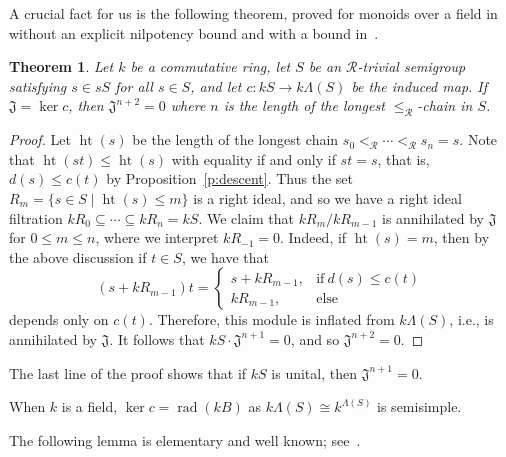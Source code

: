 \documentclass[reqno,11pt]{amsart}
\newcommand{\hgt}{\mathop{\mathrm {ht}}}
\newcommand{\rad}{\mathop{\mathrm{rad}}\nolimits}
\newcommand{\R}{\mathrel{\mathscr R}} %
\newtheorem{Thm}{Theorem}[section]
\numberwithin{equation}{section}
\begin{document}
A crucial fact for us is the following theorem, proved for monoids  over a field in~\cite{AMSV} without an explicit nilpotency bound and with a bound in~\cite{SchockerRtrivial}. 

\begin{Thm}\label{t:nil}
Let $k$ be a commutative ring, let $S$ be an $\mathscr R$-trivial semigroup satisfying $s\in sS$ for all $s\in S$, and let $c\colon kS\to k\Lambda(S)$ be the induced map.  If $\mathfrak J=\ker c$, then $\mathfrak J^{n+2}=0$ where $n$ is the length of the longest $\leq_{\R}$-chain in $S$.     
\end{Thm}
\begin{proof}
Let $\hgt(s)$ be the length of the longest chain $s_0<_{\R}\cdots <_{\R} s_n=s$.  Note that $\hgt(st)\leq \hgt(s)$ with equality if and only if $st=s$, that is, $d(s)\leq c(t)$ by Proposition~\ref{p:descent}.   Thus the set $R_m = \{s\in S\mid \hgt(s)\leq m\}$  is a right ideal, and so we have a right ideal filtration $kR_0\subseteq \cdots\subseteq kR_n=kS$.  We claim that $kR_m/kR_{m-1}$ is annihilated by $\mathfrak J$ for $0\leq m\leq n$, where we interpret $kR_{-1}=0$.  Indeed,  if $\hgt(s)=m$, then by the above discussion if $t\in S$, we have that
\[(s+kR_{m-1}) t= \begin{cases}
 s+kR_{m-1}, & \text{if}\ d(s)\leq c(t)\\ kR_{m-1}, & \text{else}    
\end{cases}\]
depends only on $c(t)$.  Therefore, this module is inflated from  $k\Lambda(S)$, i.e., is annihilated by $\mathfrak J$.  It follows that $kS\cdot \mathfrak J^{n+1}=0$, and so $\mathfrak J^{n+2}=0$.
\end{proof}

The last line of the proof shows that if $kS$ is unital, then $\mathfrak J^{n+1}=0$.

When $k$ is a field, $\ker c=\rad(kB)$ as $k\Lambda(S)\cong k^{\Lambda(S)}$ is semisimple.



The following lemma is elementary and well known; see~\cite{bandquiver}.  %
\end{document}
